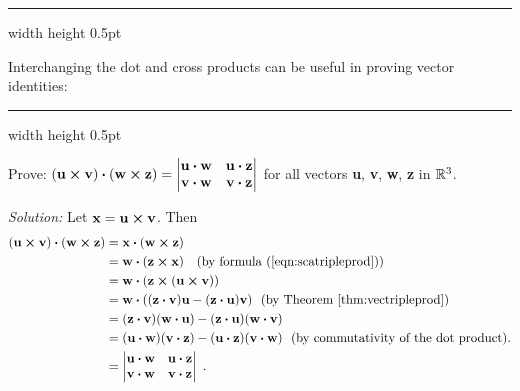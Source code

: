 \hrule width \textwidth height 0.5pt
\vspace{2mm}

Interchanging the dot and cross products can be useful in proving vector identities:

\vspace{3mm}
\hrule width \textwidth height 0.5pt
\begin{exmp}\label{exmp:quadcrossdot}
 Prove: $(\textbf{u} \bm{\times} \textbf{v}) \bm{\cdot} (\textbf{w} \bm{\times} \textbf{z}) =
 \begin{vmatrix}
   \textbf{u} \bm{\cdot} \textbf{w} & \textbf{u} \bm{\cdot} \textbf{z}\\
   \textbf{v} \bm{\cdot} \textbf{w} & \textbf{v} \bm{\cdot} \textbf{z}\end{vmatrix}$ for all vectors \textbf{u},
   \textbf{v}, \textbf{w}, \textbf{z} in $\mathbb{R}^{3}$.\vspace{0.5mm}
 \par\noindent\emph{Solution:} Let $\textbf{x} = \textbf{u} \bm{\times} \textbf{v}$. Then
 \begin{align*}
  (\textbf{u} \bm{\times} \textbf{v}) \bm{\cdot} (\textbf{w} \bm{\times} \textbf{z}) &=
   \textbf{x} \bm{\cdot} (\textbf{w} \bm{\times} \textbf{z})\\
  &= \textbf{w} \bm{\cdot} (\textbf{z} \bm{\times} \textbf{x}) \text{~~~(by formula (\ref{eqn:scatripleprod}))}\\
  &= \textbf{w} \bm{\cdot} (\textbf{z} \bm{\times} (\textbf{u} \bm{\times} \textbf{v}))\\
  &= \textbf{w} \bm{\cdot} ((\textbf{z} \bm{\cdot} \textbf{v})\textbf{u} -
   (\textbf{z} \bm{\cdot} \textbf{u})\textbf{v}) \text{~~(by Theorem \ref{thm:vectripleprod})}\\
  &= (\textbf{z} \bm{\cdot} \textbf{v})(\textbf{w} \bm{\cdot} \textbf{u}) -
  (\textbf{z} \bm{\cdot} \textbf{u})(\textbf{w} \bm{\cdot} \textbf{v})\\
  &= (\textbf{u} \bm{\cdot} \textbf{w})(\textbf{v} \bm{\cdot} \textbf{z}) -
  (\textbf{u} \bm{\cdot} \textbf{z})(\textbf{v} \bm{\cdot} \textbf{w}) \text{~~(by commutativity of the dot product).}\\
  &= \begin{vmatrix}
   \textbf{u} \bm{\cdot} \textbf{w} & \textbf{u} \bm{\cdot} \textbf{z}\\
   \textbf{v} \bm{\cdot} \textbf{w} & \textbf{v} \bm{\cdot} \textbf{z}\end{vmatrix}~.
 \end{align*}
\end{exmp}\vspace{-7.5mm}
